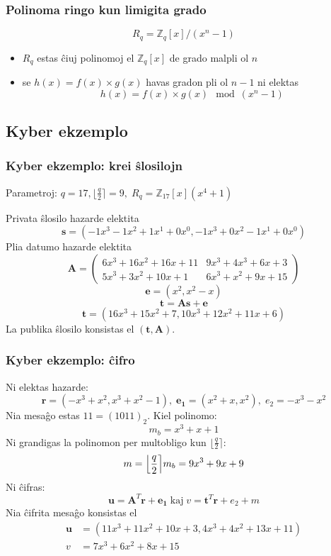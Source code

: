 \documentclass[utf8, aspectratio=169]{beamer}
\begin{document}
\begin{frame}
  \frametitle{Polinoma ringo kun limigita grado}
  \[
    R_q = \mathbb{Z}_q[x]/(x^n-1)
  \]

  \begin{itemize}
  \item<+-> $R_q$ estas ĉiuj polinomoj el $\mathbb{Z}_q[x]$ de grado malpli ol $n$
  \item<+-> se $h(x) = f(x) \times g(x)$ havas gradon pli ol $n-1$ ni elektas
    \[h(x) = f(x) \times g(x) \mod (x^n-1)\]
  \end{itemize}

  \vspace{0.5em}
\end{frame}

\subsection*{Kyber ekzemplo}

\begin{frame}
  \frametitle{Kyber ekzemplo: krei ŝlosilojn}
  Parametroj: $q = 17, \bigl\lfloor\frac{q}{2}\bigr\rceil = 9, \; R_q = \mathbb{Z}_{17}[x](x^4 + 1)$\par
  \pause
  \vspace{0.5em}
  Privata ŝlosilo hazarde elektita
  \[ \mathbf{s} = \left( - 1x^3 - 1x^2 + 1x^1 + 0x^0, - 1x^3 +0x^2 - 1x^1 + 0x^0 \right) \]
  \pause
  Plia datumo hazarde elektita
  \[
    \mathbf{A} =
    \begin{pmatrix}
      6x^3 + 16x^2 + 16x + 11 & 9x^3 + 4x^3 + 6x + 3 \\
      5x^3 + 3x^2 + 10x +1    & 6x^3 + x^2 + 9x + 15
    \end{pmatrix}
  \]
  \[
    \mathbf{e} = \left( x^2, x^2 - x \right)
  \]
  \[
    \mathbf{t} = \mathbf{A}\mathbf{s} + \mathbf{e}
  \]
  \[
    \mathbf{t} = \left( 16x^3 + 15x^2 + 7, 10x^3 + 12x^2 + 11x + 6 \right)
  \]
  \pause
  La publika ŝlosilo konsistas el $(\mathbf{t}, \mathbf{A})$.
\end{frame}

\begin{frame}
  \frametitle{Kyber ekzemplo: ĉifro}
  Ni elektas hazarde:
  \[
    \mathbf{r} = \left( -x^3 + x^2, x^3 + x^2 - 1 \right), \; \mathbf{e_1} = \left( x^2 + x, x^2 \right), \; e_2 = -x^3 - x^2
  \]
  \pause
  Nia mesaĝo estas $11 = (1011)_2$. Kiel polinomo:
  \[m_b = x^3 + x + 1\]
  \pause
  Ni grandigas la polinomon per multobligo kun $\bigl\lfloor\frac{q}{2}\bigr\rceil$:
  \[m = \Bigl\lfloor\frac{q}{2}\Bigr\rceil m_b = 9x^3 + 9x + 9\]
  \pause
  Ni ĉifras:
  \[
    \mathbf{u} = \mathbf{A}^T\mathbf{r} + \mathbf{e_1} \;\text{kaj}\; v = \mathbf{t}^T\mathbf{r} + e_2 + m
  \]
  \pause
  Nia ĉifrita mesaĝo konsistas el
  \[
    \begin{split}
      \mathbf{u} & = (11x^3 + 11x^2 + 10x + 3, 4x^3 + 4x^2 + 13x + 11) \\
      v & = 7x^3 + 6x^2 + 8x + 15
    \end{split}
  \]
\end{frame}
\end{document}
